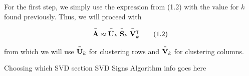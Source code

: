 \documentclass[../../ClusteringConnectionsMAIN.tex]{subfiles}
\begin{document}
\begin{flushleft}
\begin{large}

For the first step, we simply use the expression from (1.2) with the value for $k$ found previously. Thus, we will proceed with

\begin{align}
\bar{\bar{\mathbf{A}}} \approx \bar{\bar{\mathbf{U}}}_k \; \bar{\bar{\mathbf{S}}}_k \; \bar{\bar{\mathbf{V}}}_k^\intercal \tag{1.2}
\end{align}

from which we will use $\bar{\bar{\mathbf{U}}}_k$ for clustering rows and $\bar{\bar{\mathbf{V}}}_k$ for clustering columns. \newline


Choosing which SVD section SVD Signs Algorithm info goes here


\end{large}
\end{flushleft}
\end{document}
